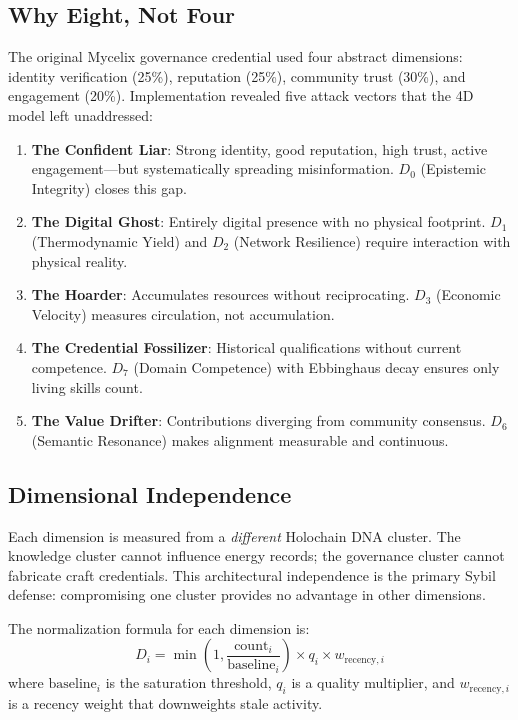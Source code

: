 \documentclass[11pt,twocolumn]{article}
\begin{document}
\subsection{Why Eight, Not Four}

The original Mycelix governance credential used four abstract dimensions: identity verification (25\%), reputation (25\%), community trust (30\%), and engagement (20\%). Implementation revealed five attack vectors that the 4D model left unaddressed:

\begin{enumerate}[nosep]
  \item \textbf{The Confident Liar}: Strong identity, good reputation, high trust, active engagement---but systematically spreading misinformation. $D_0$ (Epistemic Integrity) closes this gap.
  \item \textbf{The Digital Ghost}: Entirely digital presence with no physical footprint. $D_1$ (Thermodynamic Yield) and $D_2$ (Network Resilience) require interaction with physical reality.
  \item \textbf{The Hoarder}: Accumulates resources without reciprocating. $D_3$ (Economic Velocity) measures circulation, not accumulation.
  \item \textbf{The Credential Fossilizer}: Historical qualifications without current competence. $D_7$ (Domain Competence) with Ebbinghaus decay ensures only living skills count.
  \item \textbf{The Value Drifter}: Contributions diverging from community consensus. $D_6$ (Semantic Resonance) makes alignment measurable and continuous.
\end{enumerate}

\subsection{Dimensional Independence}

Each dimension is measured from a \emph{different} Holochain DNA cluster. The knowledge cluster cannot influence energy records; the governance cluster cannot fabricate craft credentials. This architectural independence is the primary Sybil defense: compromising one cluster provides no advantage in other dimensions.

The normalization formula for each dimension is:
\begin{equation}
D_i = \min\left(1, \frac{\text{count}_i}{\text{baseline}_i}\right) \times q_i \times w_{\text{recency},i}
\end{equation}
where $\text{baseline}_i$ is the saturation threshold, $q_i$ is a quality multiplier, and $w_{\text{recency},i}$ is a recency weight that downweights stale activity.
\end{document}
